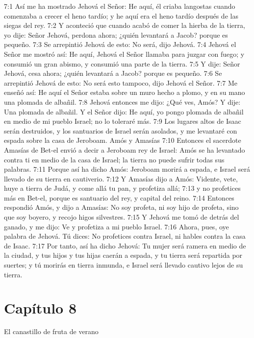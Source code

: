 7:1 Así me ha mostrado Jehová el Señor: He aquí, él criaba langostas cuando comenzaba a crecer el heno tardío; y he aquí era el heno tardío después de las siegas del rey.   
7:2 Y aconteció que cuando acabó de comer la hierba de la tierra, yo dije: Señor Jehová, perdona ahora; ¿quién levantará a Jacob? porque es pequeño.   
7:3 Se arrepintió Jehová de esto: No será, dijo Jehová.   
7:4 Jehová el Señor me mostró así: He aquí, Jehová el Señor llamaba para juzgar con fuego; y consumió un gran abismo, y consumió una parte de la tierra.   
7:5 Y dije: Señor Jehová, cesa ahora; ¿quién levantará a Jacob? porque es pequeño.   
7:6 Se arrepintió Jehová de esto: No será esto tampoco, dijo Jehová el Señor.   
7:7 Me enseñó así: He aquí el Señor estaba sobre un muro hecho a plomo, y en su mano una plomada de albañil.   
7:8 Jehová entonces me dijo: ¿Qué ves, Amós? Y dije: Una plomada de albañil. Y el Señor dijo: He aquí, yo pongo plomada de albañil en medio de mi pueblo Israel; no lo toleraré más.   
7:9 Los lugares altos de Isaac serán destruidos, y los santuarios de Israel serán asolados, y me levantaré con espada sobre la casa de Jeroboam.   
Amós y Amasías   
7:10 Entonces el sacerdote Amasías de Bet-el envió a decir a Jeroboam rey de Israel: Amós se ha levantado contra ti en medio de la casa de Israel; la tierra no puede sufrir todas sus palabras.   
7:11 Porque así ha dicho Amós: Jeroboam morirá a espada, e Israel será llevado de su tierra en cautiverio.   
7:12 Y Amasías dijo a Amós: Vidente, vete, huye a tierra de Judá, y come allá tu pan, y profetiza allá;   
7:13 y no profetices más en Bet-el, porque es santuario del rey, y capital del reino.   
7:14 Entonces respondió Amós, y dijo a Amasías: No soy profeta, ni soy hijo de profeta, sino que soy boyero, y recojo higos silvestres.   
7:15 Y Jehová me tomó de detrás del ganado, y me dijo: Ve y profetiza a mi pueblo Israel.   
7:16 Ahora, pues, oye palabra de Jehová. Tú dices: No profetices contra Israel, ni hables contra la casa de Isaac.   
7:17 Por tanto, así ha dicho Jehová: Tu mujer será ramera en medio de la ciudad, y tus hijos y tus hijas caerán a espada, y tu tierra será repartida por suertes; y tú morirás en tierra inmunda, e Israel será llevado cautivo lejos de su tierra.   
\section*{Capítulo 8 } 
El canastillo de fruta de verano   
  
